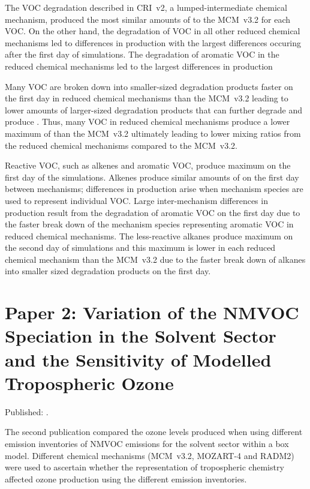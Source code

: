 The VOC degradation described in CRI~v2, a lumped-intermediate chemical mechanism, produced the most similar amounts of  to the MCM~v3.2 for each VOC.
On the other hand, the degradation of VOC in all other reduced chemical mechanisms led to differences in  production with the largest differences occuring after the first day of simulations.
The degradation of aromatic VOC in the reduced chemical mechanisms led to the largest differences in  production 

Many VOC are broken down into smaller-sized degradation products faster on the first day in reduced chemical mechanisms than the MCM~v3.2 leading to lower amounts of larger-sized degradation products that can further degrade and produce .
Thus, many VOC in reduced chemical mechanisms produce a lower maximum of  than the MCM~v3.2 ultimately leading to lower  mixing ratios from the reduced chemical mechanisms compared to the MCM~v3.2.

Reactive VOC, such as alkenes and aromatic VOC, produce maximum  on the first day of the simulations.
Alkenes produce similar amounts of  on the first day between mechanisms; differences in  production arise when mechanism species are used to represent individual VOC.
Large inter-mechanism differences in  production result from the degradation of aromatic VOC on the first day due to the faster break down of the mechanism species representing aromatic VOC in reduced chemical mechanisms.
The less-reactive alkanes produce maximum  on the second day of simulations and this maximum is lower in each reduced chemical mechanism than the MCM~v3.2 due to the faster break down of alkanes into smaller sized degradation products on the first day.

\singlespacing
\section[Paper 2]{Paper 2: Variation of the NMVOC Speciation in the Solvent Sector and the Sensitivity of Modelled Tropospheric Ozone} \label{s:EI_results}
\onehalfspacing

Published: .
\vspace{5mm}

The second publication compared the ozone levels produced when using different emission inventories of NMVOC emissions for the solvent sector within a box model.
Different chemical mechanisms (MCM~v3.2, MOZART-4 and RADM2) were used to ascertain whether the representation of tropospheric chemistry affected ozone production using the different emission inventories.

